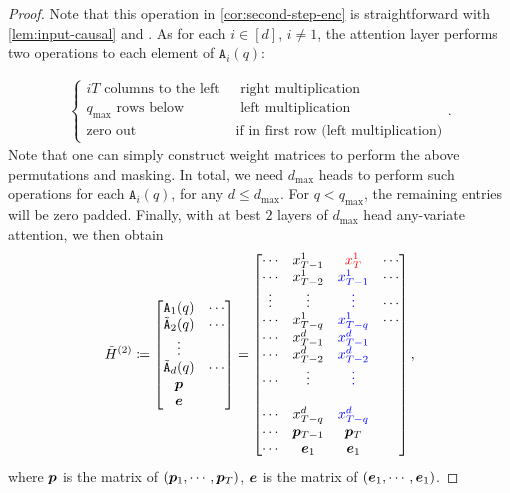 \begin{proof}
Note that this operation in \cref{cor:second-step-enc} is straightforward with \cref{lem:input-causal} and \citep[Proposition~A.5]{bai2024transformers}.
As for each $i \in [d]$, $i \neq 1$, the attention layer performs two operations to each element of $\mathtt{A}_i(q)$:

\begin{align*}
    \begin{cases}
        iT \text{ columns to the left } & \text{ right multiplication} \\
        q_{\max} \text{ rows below } & \text{ left multiplication} \\
        \text{zero out} & \text{if in first row (left multiplication)}
    \end{cases}.
\end{align*}
Note that one can simply construct weight matrices to perform the above permutations and masking.
In total, we need $d_{\max}$ heads to perform such operations for each $\mathtt{A}_i(q)$, for any $d \leq d_{\max}$.
For $q < q_{\max}$, the remaining entries will be zero padded.
Finally, with at best $2$ layers of $d_{\max}$ head any-variate attention, we then obtain
\[
\tilde{H}^{(2)}
\coloneqq
    \begin{bmatrix}
        \mathtt{A}_1(q) & \cdots 
        \\
        \tilde{\mathtt{A}}_2(q) & \cdots
        \\
        \vdots
        \\
        \tilde{\mathtt{A}}_d(q) & \cdots
        \\
        \bp
        \\
        \be
    \end{bmatrix}
    =
    \begin{bmatrix}
     \cdots & x_{T-1}^1 & \mathcolor{red}{x_T^1} &\cdots 
    \\
    \cdots & x_{T-2}^1 & \mathcolor{blue}{x_{T-1}^1} &\cdots
    \\
    \vdots & \vdots & \mathcolor{blue}\vdots &\cdots
    \\
    \cdots & x_{T-q}^1 & \mathcolor{blue}{x_{T-q}^1} &\cdots
    \\
    \cdots & x_{T-1}^d & \mathcolor{blue}{x_{T-1}^d}
    \\
    \cdots & x_{T-2}^d & \mathcolor{blue}{x_{T-2}^d}
    \\
    \cdots & \vdots & \mathcolor{blue}\vdots \\
    \\
    \cdots & x_{T-q}^d & \mathcolor{blue}{x_{T-q}^d}
    \\
    \cdots & \bp_{T-1} & \bp_{T}
    \\
    \cdots & \be_1 & \be_1
    \end{bmatrix},
\]
where $\bm{p}$ is the matrix of $(\bm{p}_1, \cdots, \bm{p}_T)$, $\bm{e}$ is the matrix of $(\bm{e}_1, \cdots, \bm{e}_1)$.


\end{proof}
